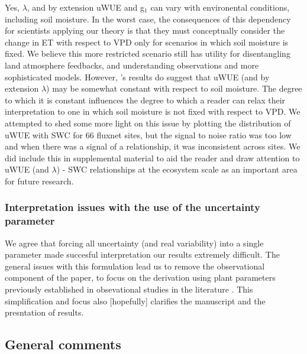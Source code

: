 \documentclass[12pt]{article}
\begin{document}
Yes, $\lambda$, and by extension uWUE and g$_1$ can vary with
environental conditions, including soil moisture. In the worst case,
the consequences of this dependency for scientists applying our theory
is that they must conceptually consider the change in ET with respect
to VPD only for scenarios in which soil moisture is fixed. We believe
this more restricted scenario still has utility for disentangling land
atmosphere feedbacks, and understanding observations and more
sophisticated models. However, \cite{Zhou_2015}'s results do suggest
that uWUE (and by extension $\lambda$) may be somewhat constant with
respect to soil moisture. The degree to which it is constant
influences the degree to which a reader can relax their interpretation
to one in which soil moisture is not fixed with respect to VPD. We
attempted to shed some more light on this issue by plotting the
distribution of uWUE with SWC for 66 fluxnet sites, but the signal to
noise ratio was too low and when there was a signal of a relationship,
it was inconsistent across sites. We did include this in supplemental
material to aid the reader and draw attention to uWUE (and $\lambda$)
- SWC relationships at the ecosystem scale as an important area for
future research.

\subsubsection{Interpretation issues with the use of the uncertainty
  parameter}

We agree that forcing all uncertainty (and real variability) into a
single parameter made succesful interpretation our results extremely
difficult. The general issues with this formulation lead us to remove
the observational component of the paper, to focus on the derivation
using plant parameters previously established in obsevational studies
in the literature \citep{Zhou_2015, Medlyn_2017}. This simplification
and focus also [hopefully] clarifies the manuscript and the
presntation of results.

\subsection{General comments}
\end{document}
